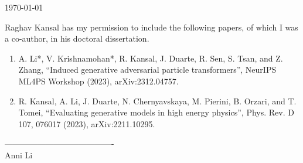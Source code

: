 \documentclass{article}
\begin{document}
\today

Raghav Kansal has my permission to include the following papers, of which
I was a co-author, in his doctoral dissertation.

\begin{enumerate}
    \item A. Li*, V. Krishnamohan*, R. Kansal, J. Duarte, R. Sen, S. Tsan, and Z. Zhang, “Induced generative adversarial particle transformers”, NeurIPS ML4PS Workshop (2023), arXiv:2312.04757.
    \item R. Kansal, A. Li, J. Duarte, N. Chernyavskaya, M. Pierini, B. Orzari, and T. Tomei, “Evaluating generative models in high energy physics”, Phys. Rev. D 107, 076017 (2023), arXiv:2211.10295.
\end{enumerate}

\baselineskip
----------------------------------------\\
Anni Li
\end{document}

